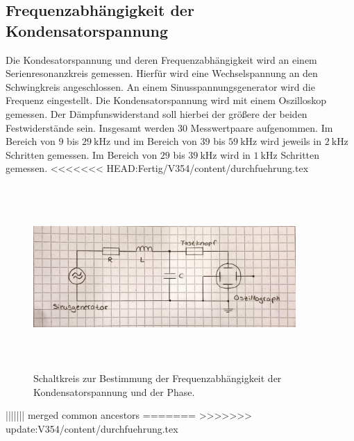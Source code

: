 \subsection{Frequenzabhängigkeit der Kondensatorspannung}
\label{sec:c}
Die Kondesatorspannung und deren Frequenzabhängigkeit wird an einem Serienresonanzkreis gemessen. Hierfür wird eine 
Wechselspannung an den Schwingkreis angeschlossen. An einem Sinusspannungsgenerator wird die Frequenz eingestellt.
Die Kondensatorspannung wird mit einem Oszilloskop gemessen. Der Dämpfunswiderstand soll hierbei der 
größere der beiden Festwiderstände sein. %
Insgesamt werden 30 Messwertpaare aufgenommen. Im Bereich von $\num{9}$ bis $\SI{29}{\kilo\hertz}$ und
im Bereich von $\num{39}$ bis $\SI{59}{\kilo\hertz}$ wird jeweils in $\SI{2}{\kilo\hertz}$ Schritten
gemessen. Im Bereich von $\num{29}$ bis $\SI{39}{\kilo\hertz}$ wird in $\SI{1}{\kilo\hertz}$ Schritten
gemessen.
<<<<<<< HEAD:Fertig/V354/content/durchfuehrung.tex
\begin{figure}
    \centering
    \includegraphics[width= 10cm, height= 7cm]{build/c.jpg}
    \caption{Schaltkreis zur Bestimmung der Frequenzabhängigkeit der Kondensatorspannung und der Phase.}
    \label{fig:c}
\end{figure}
||||||| merged common ancestors
=======
>>>>>>> update:V354/content/durchfuehrung.tex

